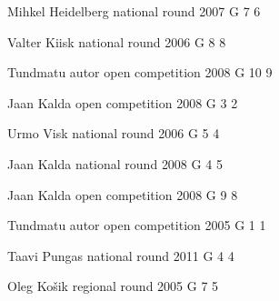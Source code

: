 \documentclass[11pt]{article}
\begin{document}
\ylDisplay{} %
{Mihkel Heidelberg} %
{national round} %
{2007} %
{G 7} %
{6} %
{

\ifEngSolution
\fi
}

\ylDisplay{} %
{Valter Kiisk} %
{national round} %
{2006} %
{G 8} %
{8} %
{

\ifEngSolution
\fi
}

\ylDisplay{} %
{Tundmatu autor} %
{open competition} %
{2008} %
{G 10} %
{9} %
{

\ifEngSolution
\fi
}

\ylDisplay{} %
{Jaan Kalda} %
{open competition} %
{2008} %
{G 3} %
{2} %
{

\ifEngSolution
\fi
}

\ylDisplay{} %
{Urmo Visk} %
{national round} %
{2006} %
{G 5} %
{4} %
{

\ifEngSolution
\fi
}

\ylDisplay{} %
{Jaan Kalda} %
{national round} %
{2008} %
{G 4} %
{5} %
{

\ifEngSolution
\fi
}

\ylDisplay{} %
{Jaan Kalda} %
{open competition} %
{2008} %
{G 9} %
{8} %
{

\ifEngSolution
\fi
}

\ylDisplay{} %
{Tundmatu autor} %
{open competition} %
{2005} %
{G 1} %
{1} %
{

\ifEngSolution
\fi
}

\ylDisplay{} %
{Taavi Pungas} %
{national round} %
{2011} %
{G 4} %
{4} %
{

\ifEngSolution
\fi
}

\ylDisplay{} %
{Oleg Košik} %
{regional round} %
{2005} %
{G 7} %
{5} %
{

\ifEngSolution
\fi
}
\end{document}
